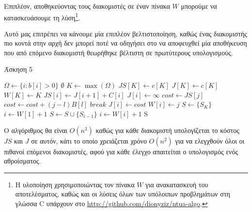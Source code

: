 \documentclass[11pt,a4paper]{book}
\begin{document}
Επιπλέον, αποθηκεύοντας τους διακομιστές σε έναν πίνακα $W$ μπορούμε να κατασκευάσουμε τη λύση\footnote{Η υλοποίηση χρησιμοποιώντας τον πίνακα $W$ για ανακατασκευή του αποτελέσματος, καθώς και οι λύσεις όλων των υπόλοιπων προβλημάτων στη γλώσσα C  υπάρχουν στο \url{http://github.com/dionyziz/ntua-algo}.}.

Αυτό μας επιτρέπει να κάνουμε μία επιπλέον βελτιστοποίηση, καθώς ένας διακομιστής πιο κοντά στην αρχή δεν μπορεί ποτέ να οδηγήσει στο να αποφευχθεί μία αποθήκευση που από επόμενο διακομιστή θεωρήθηκε βέλτιστη σε πρωτύτερους υπολογισμούς.

\begin{algorithm}[H]
\caption{\textgreek{Άσκηση 5}}
\begin{algorithmic}[1]
	\State $\Omega \gets \{ i: b[ i ] > 0 \}$
	\If {$\Omega = \emptyset$}
		\State \Return $\emptyset$
	\EndIf
	\State $K \gets \max( \Omega )$
	\State $JS[ K ] \gets c[ K ]$
	\State $J[ K ] \gets c[ K ]$
	\State $W[ K ] \gets K$
		\State $JS[ i ] \gets J[ i + 1 ] + C[ i ]$
		\State $J[ i ] \gets \infty$
			\State $cost \gets JS[ j ]$
				\State $cost \gets cost + ( j - l )B[ l ]$
					\State $break$
				\EndIf
			\EndFor
				\State $J[ i ] \gets cost$
				\State $W[ i ] \gets j$
			\EndIf
		\EndFor
	\EndFor
	\State $S \gets \{ S_K \}$
	\State $i \gets W[ 1 ] + 1$
		\State $S \gets S \cup \{ S_{i - 1} \}$
		\State $i \gets W[ i ] + 1$
	\EndWhile
	\State \Return S
\EndProcedure
\end{algorithmic}
\end{algorithm}

Ο αλγόριθμος θα είναι $O( n^3 )$ καθώς για κάθε διακομιστή υπολογίζεται το κόστος $JS$ και $J$ σε αυτόν, κάτι το οποίο χρειάζεται χρόνο $O( n^2 )$ για να ελεγχθούν όλοι οι πιθανοί επόμενοι διακομιστές, αφού για κάθε έλεγχο απαιτείται ο υπολογισμός ενός αθροίσματος.
\end{document}
